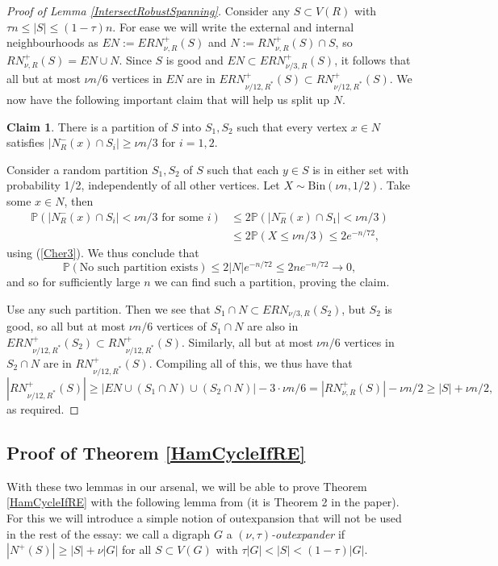 \documentclass[10pt,letterpaper, reqno]{amsart}
\theoremstyle{definition}
\numberwithin{equation}{section}
\newtheorem{claim}{Claim}
\begin{document}
\begin{proof}[Proof of Lemma \ref{IntersectRobustSpanning}]
	Consider any $S \subset V(R)$ with $\tau n \leq |S| \leq (1-\tau)n$. For ease we will write the external and internal neighbourhoods as $EN :=ERN^+_{\nu,R}(S)$ and $N:= RN^+_{\nu,R}(S) \cap S$, so $RN^+_{\nu,R}(S) = EN \cup N$. Since $S$ is good and $EN \subset ERN^+_{\nu/3,R}(S)$, it follows that all but at most  $\nu n/6$ vertices in $EN$ are in $ERN^+_{\nu/12,R^*}(S) \subset RN^+_{\nu/12,R^*}(S)$. We now have the following important claim that will help us split up $N$. 
	\begin{claim}
			There is a partition of $S$ into $S_1, S_2$ such that every vertex $x \in N$ satisfies $|N^-_R(x) \cap S_i| \geq \nu n/3$ for $i=1,2$.
	\end{claim}
	\begin{adjustwidth}{2.5em}{0pt}
		\noindent Consider a random partition $S_1,S_2$ of $S$ such that each $y\in S$ is in either set with probability 1/2, independently of all other vertices. Let $X \sim \text{Bin}(\nu n, 1/2)$. Take some $x \in N$, then 
		\begin{align*}
			\mathbb{P}(|N^-_R(x)\cap S_i | < \nu n/3 \text{ for some } i) & \leq 2 \mathbb{P}(|N^-_R(x)\cap S_1 | < \nu n/3) \\ &\leq 2\mathbb{P}(X \leq \nu n/3) \leq 2e^{-n/72},
		\end{align*}
		using (\ref{Cher3}). We thus conclude that 
		$$\mathbb{P}(\text{No such partition exists}) \leq 2|N| e^{-n/72} \leq 2ne^{-n/72} \to 0,$$
		and so for sufficiently large $n$ we can find such a partition, proving the claim.
	\end{adjustwidth}

	\noindent Use any such partition. Then we see that $S_1 \cap N \subset ERN_{\nu/3, R} (S_2)$, but $S_2$ is good, so all but at most $\nu n/6$ vertices of $S_1 \cap N$ are also in $ERN^+_{\nu/12, R^*}(S_2) \subset RN^+_{\nu/12, R^*}(S)$. Similarly, all but at most $\nu n/6$ vertices in $S_2 \cap N$ are in $RN^+_{\nu/12, R^*}(S)$. Compiling all of this, we thus have that 
	$$ |RN^+_{\nu/12,R^*}(S)| \geq |EN \cup (S_1 \cap N) \cup (S_2 \cap N)| - 3 \cdot \nu n/6 = |RN^+_{\nu,R}(S)| - \nu n/2 \geq |S| + \nu n/2,$$
	as required.
\end{proof}


\subsection{Proof of Theorem \ref{HamCycleIfRE}}
With these two lemmas in our arsenal, we will be able to prove Theorem \ref{HamCycleIfRE} with the following lemma from \cite{HamCycleNormalExpander} (it is Theorem 2 in the paper). For this we will introduce a simple notion of outexpansion that will not be used in the rest of the essay: we call a digraph $G$ a \textit{$(\nu,\tau)$-outexpander} if $|N^+(S)| \geq |S| + \nu |G|$ for all $S\subset V(G)$ with $\tau |G| < |S| < (1-\tau)|G|$.
\end{document}
